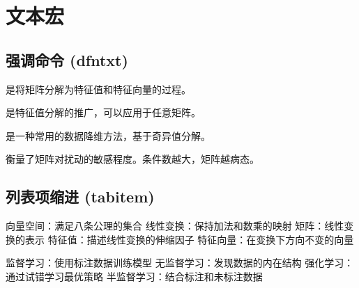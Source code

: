 \section{文本宏}

\subsection{强调命令 (dfntxt)}

 是将矩阵分解为特征值和特征向量的过程。

 是特征值分解的推广，可以应用于任意矩阵。

 是一种常用的数据降维方法，基于奇异值分解。

 衡量了矩阵对扰动的敏感程度。条件数越大，矩阵越病态。

\subsection{列表项缩进 (tabitem)}

\tabitem 向量空间：满足八条公理的集合
\tabitem 线性变换：保持加法和数乘的映射
\tabitem 矩阵：线性变换的表示
\tabitem 特征值：描述线性变换的伸缩因子
\tabitem 特征向量：在变换下方向不变的向量

\tabitem 监督学习：使用标注数据训练模型
\tabitem 无监督学习：发现数据的内在结构
\tabitem 强化学习：通过试错学习最优策略
\tabitem 半监督学习：结合标注和未标注数据